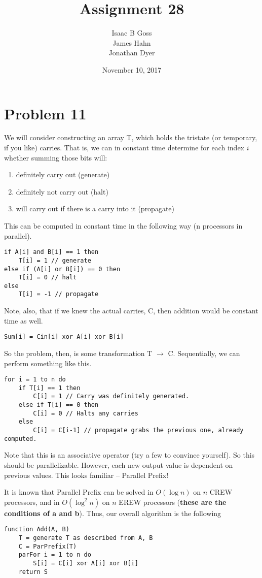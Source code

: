 \documentclass{article}
\author{Isaac B Goss\\ James Hahn\\ Jonathan Dyer}
\date{November 10, 2017}
\title{Assignment 28}
\providecommand{\prob}[1]{\section*{Problem #1}}
\providecommand{\tightlist}{
    \setlength{\itemsep}{0pt}\setlength{\parskip}{0pt}
}
\begin{document}
\maketitle
    \prob{11}
    We will consider constructing an array T, which holds the tristate (or temporary, if you like) carries.
    That is, we can in constant time determine for each index $i$ whether summing those bits will:
    \begin{enumerate}\tightlist
        \item definitely carry out (generate)
        \item definitely not carry out (halt)
        \item will carry out if there is a carry into it (propagate)
    \end{enumerate}
    This can be computed in constant time in the following way (n processors in parallel).
    \begin{lstlisting}
if A[i] and B[i] == 1 then
    T[i] = 1 // generate
else if (A[i] or B[i]) == 0 then
    T[i] = 0 // halt
else
    T[i] = -1 // propagate
    \end{lstlisting}
    Note, also, that if we knew the actual carries, C, then addition would be constant time as well.
    \begin{lstlisting}
Sum[i] = Cin[i] xor A[i] xor B[i]
    \end{lstlisting}

    So the problem, then, is some transformation T $\to$ C.
    Sequentially, we can perform something like this.
    \begin{lstlisting}
for i = 1 to n do
    if T[i] == 1 then
        C[i] = 1 // Carry was definitely generated.
    else if T[i] == 0 then
        C[i] = 0 // Halts any carries
    else
        C[i] = C[i-1] // propagate grabs the previous one, already computed.
    \end{lstlisting}
    Note that this is an associative operator (try a few to convince yourself).
    So this should be parallelizable.
    However, each new output value is dependent on previous values.
    This looks familiar -- Parallel Prefix!

    It is known that Parallel Prefix can be solved in $O(\log n)$ on $n$ CREW processors, and in $O(\log^2 n)$ on $n$ EREW processors (\textbf{these are the conditions of a and b}).
    Thus, our overall algorithm is the following

\begin{lstlisting}
function Add(A, B)
    T = generate T as described from A, B
    C = ParPrefix(T)
    parFor i = 1 to n do
        S[i] = C[i] xor A[i] xor B[i]
    return S
\end{lstlisting}
\end{document}
